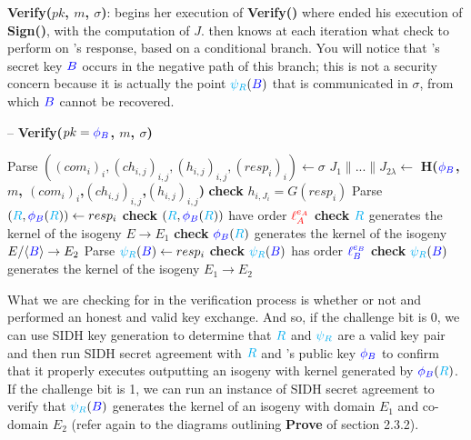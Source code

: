 \noindent
\textbf{Verify($pk$, $m$, $\sigma$)}: \alice begins her execution of \textbf{Verify()} where \bob ended his execution of \textbf{Sign()}, with the computation of $J$. \alice then knows at each iteration what check to perform on \bob's response, based on a conditional branch. You will notice that \bob's secret key $\textcolor{blue}{B}$ occurs in the negative path of this branch; this is not a security concern because it is actually the point $\textcolor{cyan}{\psi_R}(\textcolor{blue}{B})$ that is communicated in $\sigma$, from which $\textcolor{blue}{B}$ cannot be recovered.\\

\begin{algorithm}[H]
\caption{-- \textbf{Verify($pk = \textcolor{blue}{\phi_B}$, $m$, $\sigma$)}}\label{euclid}
\begin{algorithmic}[1]
\State Parse $((com_i)_i, (ch_{i,j})_{i,j}, (h_{i,j})_{i,j}, (resp_{i})_{i}) \gets \sigma$
\State $J_{1} \parallel ... \parallel J_{2\lambda} \gets$ \textbf{H($\textcolor{blue}{\phi_B}$, $m$, $(com_{i})_{i}$,$(ch_{i,j})_{i,j}$,$(h_{i,j})_{i,j}$)}
	\State \textbf{check} $h_{i,J_{i}} = G(resp_{i})$
		\State Parse $(\textcolor{cyan}{R},\textcolor{blue}{\phi_B}(\textcolor{cyan}{R})) \gets resp_{i}$
		\State \textbf{check} $(\textcolor{cyan}{R}, \textcolor{blue}{\phi_B}(\textcolor{cyan}{R}))$ have order $\textcolor{red}{\ell_{A}^{e_A}}$
		\State \textbf{check} $\textcolor{cyan}{R}$ generates the kernel of the isogeny $E \rightarrow E_{1}$
		\State \textbf{check} $\textcolor{blue}{\phi_B}(\textcolor{cyan}{R})$ generates the kernel of the isogeny $E/\langle \textcolor{blue}{B} \rangle \rightarrow E_{2}$
	\Else
		\State Parse $\textcolor{cyan}{\psi_R}(\textcolor{blue}{B}) \gets resp_{i}$
		\State \textbf{check} $\textcolor{cyan}{\psi_R}(\textcolor{blue}{B})$ has order $\textcolor{blue}{\ell_{B}^{e_B}}$
		\State \textbf{check} $\textcolor{cyan}{\psi_R}(\textcolor{blue}{B})$ generates the kernel of the isogeny $E_{1} \rightarrow E_{2}$
	\EndIf
\EndFor

	\State {}
\Else
	\State {}
\EndIf
\end{algorithmic}
\end{algorithm}

\noindent
What we are checking for in the verification process is whether or not \bob and \randall performed an honest and valid key exchange. And so, if the challenge bit is 0, we can use SIDH key generation to determine that $\textcolor{cyan}{R}$ and $\textcolor{cyan}{\psi_R}$ are a valid key pair and then run SIDH secret agreement with $\textcolor{cyan}{R}$ and \bob's public key $\textcolor{blue}{\phi_B}$ to confirm that it properly executes outputting an isogeny with kernel generated by $\textcolor{blue}{\phi_B}(\textcolor{cyan}{R})$. If the challenge bit is 1, we can run an instance of SIDH secret agreement to verify that $\textcolor{cyan}{\psi_R}(\textcolor{blue}{B})$ generates the kernel of an isogeny with domain $E_{1}$ and co-domain $E_{2}$ (refer again to the diagrams outlining \textbf{Prove} of section 2.3.2).

